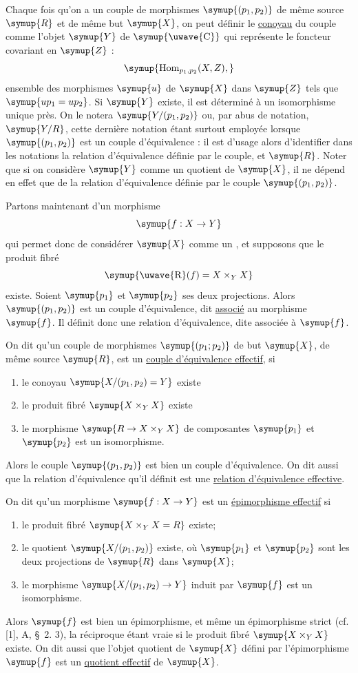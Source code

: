 Chaque fois qu'on a un couple de morphismes $\symup{(p_1,p_2)}$ de même source $\symup{R}$ et
de même but $\symup{X}$, on peut définir le \uline{conoyau} du couple comme l'objet $\symup{Y}$
de $\symup{\text{\uwave{C}}}$ qui représente le foncteur covariant en $\symup{Z}$ :
\[
  \symup{\operatorname{Hom}_{p_1,p_2}(X,Z),}
\]
ensemble des morphismes $\symup{u}$ de $\symup{X}$ dans $\symup{Z}$ tels que $\symup{up_1=up_2}$. Si $\symup{Y}$
existe, il est déterminé à un isomorphisme unique près. On le notera
$\symup{Y/(p_1,p_2)}$ ou, par abus de notation, $\symup{Y/R}$, cette dernière notation étant
surtout employée lorsque
$\symup{(p_1,p_2)}$ est un couple d'équivalence : il est d'usage alors
d'identifier dans les notations la relation d'équivalence définie par le
couple, et $\symup{R}$. Noter que si on considère $\symup{Y}$ comme un quotient de $\symup{X}$, il ne
dépend en effet que de la relation d'équivalence définie par le couple
$\symup{(p_1,p_2)}$.

Partons maintenant d'un morphisme
\[
  \symup{f:X\to Y}
\]
qui permet donc de considérer $\symup{X}$ comme un , et
supposons que le produit fibré
\[
  \symup{\text{\uwave{R}}(f)=X\times_Y X}
\]
existe. Soient $\symup{p_1}$ et $\symup{p_2}$ ses deux projections. Alors $\symup{(p_1,p_2)}$ est un
couple d'équivalence, dit \uline{associé} au morphisme $\symup{f}$. Il définit donc une
relation d'équivalence, dite associée à $\symup{f}$.

On dit qu'un couple de morphismes $\symup{(p_1;p_2)}$ de but $\symup{X}$, de même source $\symup{R}$,
est un \uline{couple d'équivalence effectif}, si
\begin{enumerate}
  \item[(i)] le conoyau $\symup{X/(p_1,p_2)=Y}$ existe
  \item[(ii)] le produit fibré $\symup{X\times_Y X}$ existe
  \item[(iii)] le morphisme $\symup{R\to X\times_Y X}$ de composantes $\symup{p_1}$ et
  $\symup{p_2}$ est un isomorphisme.
\end{enumerate}
Alors le couple $\symup{(p_1,p_2)}$ est bien un couple d'équivalence. On dit aussi que
la relation d'équivalence qu'il définit est une \uline{relation d'équivalence
effective}.

On dit qu'un morphisme $\symup{f:X\to Y}$ est un \uline{épimorphisme
effectif} si
\begin{enumerate}
  \item[(i)] le produit fibré $\symup{X\times_Y X=R}$ existe;
  \item[(ii)] le quotient $\symup{X/(p_1,p_2)}$ existe, où $\symup{p_1}$ et $\symup{p_2}$ sont les deux
  projections de $\symup{R}$ dans $\symup{X}$;
  \item[(iii)] le morphisme $\symup{X/(p_1,p_2)\to Y}$ induit par $\symup{f}$ est un
  isomorphisme.
\end{enumerate}
Alors $\symup{f}$ est bien un épimorphisme, et même un épimorphisme strict (cf. [1],
A, \S~2. 3), la réciproque étant vraie si le produit fibré $\symup{X\times_Y X}$
existe. On dit aussi que l'objet quotient de $\symup{X}$ défini par l'épimorphisme $\symup{f}$
est un \uline{quotient effectif} de $\symup{X}$.

